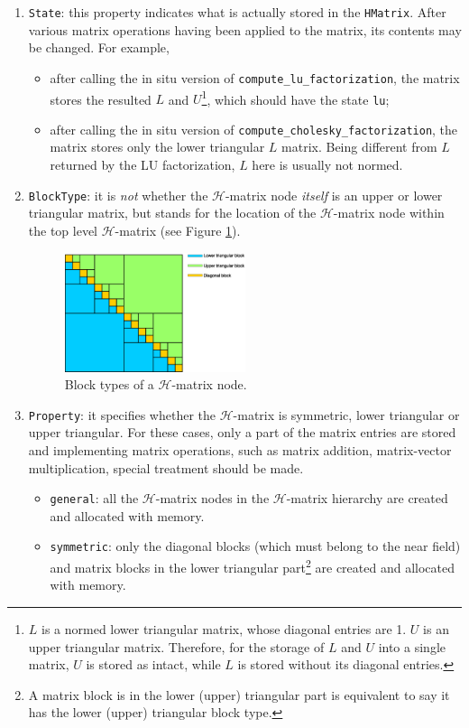 \documentclass[11pt, a4paper]{book}
\begin{document}
\begin{enumerate}
\item \texttt{State}: this property indicates what is actually stored in the
  \texttt{HMatrix}. After various matrix operations having been applied to the matrix, its
  contents may be changed. For example,
  \begin{itemize}
  \item after calling the in situ version of \texttt{compute\_lu\_factorization}, the
    matrix stores the resulted $L$ and $U$\footnote{$L$ is a normed lower triangular
      matrix, whose diagonal entries are 1. $U$ is an upper triangular matrix. Therefore,
      for the storage of $L$ and $U$ into a single matrix, $U$ is stored as intact, while
      $L$ is stored without its diagonal entries.}, which should have the state
    \texttt{lu};
  \item after calling the in situ version of \texttt{compute\_cholesky\_factorization},
    the matrix stores only the lower triangular $L$ matrix. Being different from $L$
    returned by the LU factorization, $L$ here is usually not normed.
  \end{itemize}
\item \texttt{BlockType}: it is \emph{not} whether the $\mathcal{H}$-matrix node \emph{itself} is
  an upper or lower triangular matrix, but stands for the location of the
  $\mathcal{H}$-matrix node within the top level $\mathcal{H}$-matrix (see Figure
  \ref{fig:hmat-node-block-types}).
  \begin{figure}[htbp]
    \centering
    \includegraphics[width=0.5\textwidth, height=\textheight, keepaspectratio]{figures/2023-01-23-hmat-block-type.eps}
    \caption{Block types of a $\mathcal{H}$-matrix node.}
    \label{fig:hmat-node-block-types}
  \end{figure}
\item \texttt{Property}: it specifies whether the $\mathcal{H}$-matrix is symmetric, lower
  triangular or upper triangular. For these cases, only a part of the matrix entries are
  stored and implementing matrix operations, such as matrix addition, matrix-vector
  multiplication, special treatment should be made.
  \begin{itemize}
  \item \texttt{general}: all the $\mathcal{H}$-matrix nodes in the $\mathcal{H}$-matrix
    hierarchy are created and allocated with memory.
  \item \texttt{symmetric}: only the diagonal blocks (which must belong to the near field)
    and matrix blocks in the lower triangular part\footnote{A matrix block is in the lower
      (upper) triangular part is equivalent to say it has the lower (upper) triangular
      block type.} are created and allocated with memory.


\end{itemize}
\end{enumerate}
\end{document}
